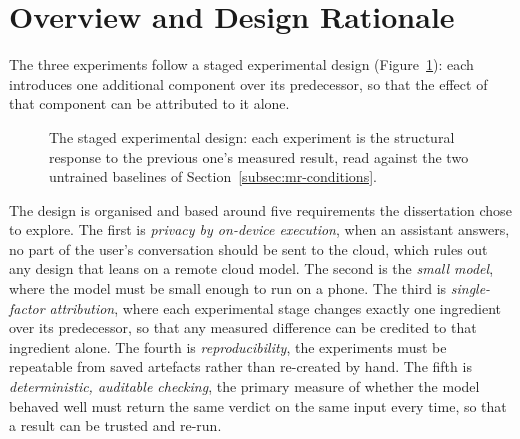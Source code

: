 \section{Overview and Design Rationale}
\label{sec:mr-overview}

The three experiments follow a staged experimental design (Figure~\ref{fig:ladder}): each introduces one additional component over its predecessor, so that the effect of that component can be attributed to it alone.

\begin{figure}[H]
  \centering
  \caption{The staged experimental design: each experiment is the structural response to the previous one's measured result, read against the two untrained baselines of Section~\ref{subsec:mr-conditions}.}
  \label{fig:ladder}
\end{figure}

The design is organised and based around five requirements the dissertation chose to explore. The first is \emph{privacy by on-device execution}, when an assistant answers, no part of the user's conversation should be sent to the cloud, which rules out any design that leans on a remote cloud model. The second is the \emph{small model}, where the model must be small enough to run on a phone. The third is \emph{single-factor attribution}, where each experimental stage changes exactly one ingredient over its predecessor, so that any measured difference can be credited to that ingredient alone. The fourth is \emph{reproducibility}, the experiments must be repeatable from saved artefacts rather than re-created by hand. The fifth is \emph{deterministic, auditable checking}, the primary measure of whether the model behaved well must return the same verdict on the same input every time, so that a result can be trusted and re-run.

